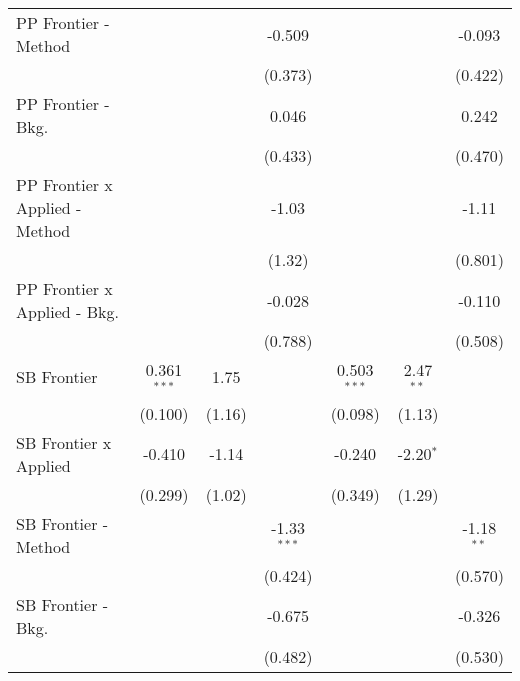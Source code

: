 \begin{tabular}{lcccccc}
   PP Frontier - Method           &               &              & -0.509        &               &              & -0.093\\   
                                  &               &              & (0.373)       &               &              & (0.422)\\   
   PP Frontier - Bkg.             &               &              & 0.046         &               &              & 0.242\\   
                                  &               &              & (0.433)       &               &              & (0.470)\\   
   PP Frontier x Applied - Method &               &              & -1.03         &               &              & -1.11\\   
                                  &               &              & (1.32)        &               &              & (0.801)\\   
   PP Frontier x Applied - Bkg.   &               &              & -0.028        &               &              & -0.110\\   
                                  &               &              & (0.788)       &               &              & (0.508)\\   
   SB Frontier                    & 0.361$^{***}$ & 1.75         &               & 0.503$^{***}$ & 2.47$^{**}$  &   \\   
                                  & (0.100)       & (1.16)       &               & (0.098)       & (1.13)       &   \\   
   SB Frontier x Applied          & -0.410        & -1.14        &               & -0.240        & -2.20$^{*}$  &   \\   
                                  & (0.299)       & (1.02)       &               & (0.349)       & (1.29)       &   \\   
   SB Frontier - Method           &               &              & -1.33$^{***}$ &               &              & -1.18$^{**}$\\   
                                  &               &              & (0.424)       &               &              & (0.570)\\   
   SB Frontier - Bkg.             &               &              & -0.675        &               &              & -0.326\\   
                                  &               &              & (0.482)       &               &              & (0.530)\\   

\end{tabular}
